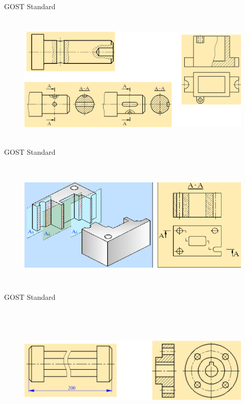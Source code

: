 \documentclass[aspectratio=169]{beamer}
\begin{document}
\begin{frame}[t]{GOST Standard}
    \framesubtitle{}
    \vspace{-0.6cm}
    \begin{figure}[H]
        \centering\includegraphics[height=6cm,width=1\textwidth,keepaspectratio]{resources/st5.png}
        \label{fig:resources/st5.png}
    \end{figure}
\end{frame}

\begin{frame}[t]{GOST Standard}
    \framesubtitle{}
    \vspace{-0.6cm}
    \begin{figure}[H]
        \centering\includegraphics[height=6cm,width=1\textwidth,keepaspectratio]{resources/st6.png}
        \label{fig:resources/st6.png}
    \end{figure}
\end{frame}

\begin{frame}[t]{GOST Standard}
    \framesubtitle{}
    \vspace{-0.6cm}
    \begin{figure}[H]
        \centering\includegraphics[height=6cm,width=1\textwidth,keepaspectratio]{resources/st7.png}
        \label{fig:resources/st7.png}
    \end{figure}
\end{frame}
\end{document}
